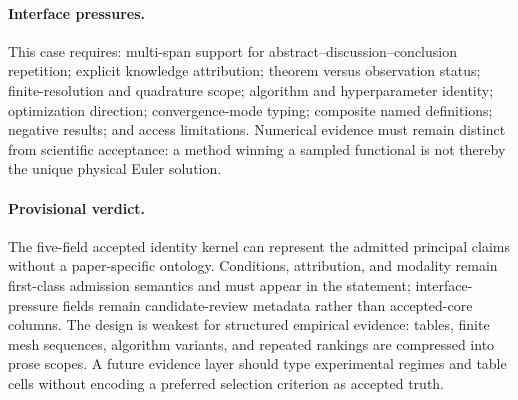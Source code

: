 \paragraph{Interface pressures.}
This case requires: multi-span support for abstract--discussion--conclusion repetition; explicit knowledge attribution; theorem versus observation status; finite-resolution and quadrature scope; algorithm and hyperparameter identity; optimization direction; convergence-mode typing; composite named definitions; negative results; and access limitations. Numerical evidence must remain distinct from scientific acceptance: a method winning a sampled functional is not thereby the unique physical Euler solution.

\paragraph{Provisional verdict.}
The five-field accepted identity kernel can represent the admitted principal claims without a paper-specific ontology. Conditions, attribution, and modality remain first-class admission semantics and must appear in the statement; interface-pressure fields remain candidate-review metadata rather than accepted-core columns. The design is weakest for structured empirical evidence: tables, finite mesh sequences, algorithm variants, and repeated rankings are compressed into prose scopes. A future evidence layer should type experimental regimes and table cells without encoding a preferred selection criterion as accepted truth.